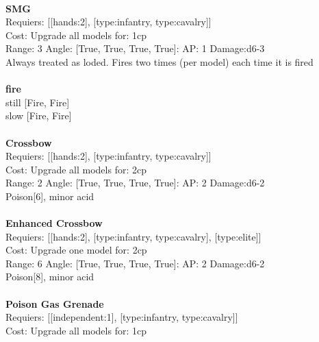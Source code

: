 \ \\
{\bf SMG } \\

Requiers: [[hands:2], [type:infantry, type:cavalry]] \\
Cost: Upgrade all models for: 1cp \\


Range: 3  Angle: [True, True, True, True]: AP: 1 Damage:d6-3 \\
Always treated as loded. Fires two times (per model) each time it is fired\\ 







\ \\ {\bf fire } \\
still [Fire, Fire] \\
slow [Fire, Fire] \\

\ \\
{\bf Crossbow } \\

Requiers: [[hands:2], [type:infantry, type:cavalry]] \\
Cost: Upgrade all models for: 2cp \\


Range: 2  Angle: [True, True, True, True]: AP: 2 Damage:d6-2 \\
Poison[6], minor acid\\ 








\ \\
{\bf Enhanced Crossbow } \\

Requiers: [[hands:2], [type:infantry, type:cavalry], [type:elite]] \\
Cost: Upgrade one model for: 2cp \\


Range: 6  Angle: [True, True, True, True]: AP: 2 Damage:d6-2 \\
Poison[8], minor acid\\ 








\ \\
{\bf Poison Gas Grenade } \\

Requiers: [[independent:1], [type:infantry, type:cavalry]] \\
Cost: Upgrade all models for: 1cp \\


